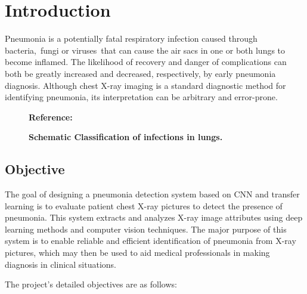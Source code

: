 %
%
%



\chapter{Introduction}

Pneumonia is a potentially fatal respiratory infection caused through bacteria, fungi or viruses that can cause the air sacs in one or both lungs to become inflamed. The likelihood of recovery and danger of complications can both be greatly increased and decreased, respectively, by early pneumonia diagnosis. Although chest X-ray imaging is a standard diagnostic method for identifying pneumonia, its interpretation can be arbitrary and error-prone.

\begin{figure}
	\centering
	\caption{\textbf{Schematic Classification of infections in lungs.}}
	\footnotesize \textbf{Reference:}\cite{Lim:2022}
	\label{fig:Schematic Classification of infections in lungs}
\end{figure}

\bigskip

\section{Objective}

The goal of designing a pneumonia detection system based on CNN and transfer learning is to evaluate patient chest X-ray pictures to detect the presence of pneumonia. This system extracts and analyzes X-ray image attributes using deep learning methods and computer vision techniques. The major purpose of this system is to enable reliable and efficient identification of pneumonia from X-ray pictures, which may then be used to aid medical professionals in making diagnosis in clinical situations.\autocite{Lim:2022}

The project's detailed objectives are as follows:\\


